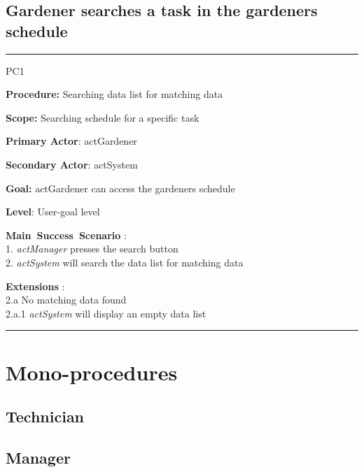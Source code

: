 \break

\subsection{Gardener searches a task in the gardeners schedule}
\vspace{0.5cm}
\hrule
\hfill \break
\begin{lyxlist}{PC1}
\small{
\item [\textbf{Procedure:}] Searching data list for matching data
\item [\textbf{Scope:}] Searching schedule for a specific task
\item [\textbf{Primary Actor}:] actGardener
\item [\textbf{Secondary Actor}:] actSystem
\item [\textbf{Goal:}] actGardener can access the gardeners schedule
\item [\textbf{Level}:] User-goal level
\item [\textbf{Main~Success~Scenario}]:\\
1. \emph{actManager} presses the search button\\
2. \emph{actSystem} will search the data list for matching data\\
\item [\textbf{Extensions}]:\\
2.a No matching data found\\
\hspace*{0.5cm} 2.a.1 \emph{actSystem} will display an empty data list}
\end{lyxlist}
\hrule
\vspace{0.5cm}



\break



\section{Mono-procedures}



\subsection{Technician}







\subsection{Manager}
